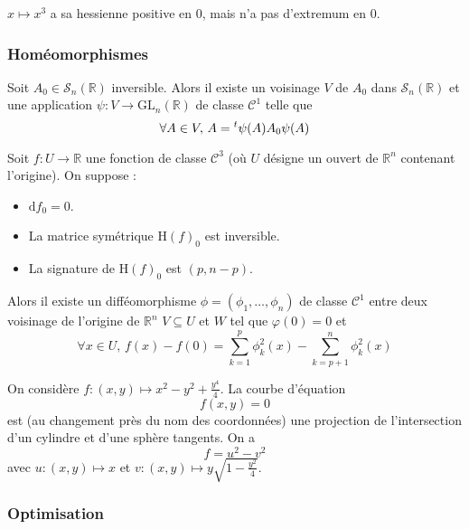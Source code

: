 	\begin{cexample}
		$x \mapsto x^3$ a sa hessienne positive en $0$, mais n'a pas d'extremum en $0$.
	\end{cexample}

	\subsubsection{Homéomorphismes}


	\begin{lemma}
		Soit $A_0 \in \mathcal{S}_n(\mathbb{R})$ inversible. Alors il existe un voisinage $V$ de $A_0$ dans $\mathcal{S}_n(\mathbb{R})$ et une application $\psi : V \rightarrow \mathrm{GL}_n(\mathbb{R})$ de classe $\mathcal{C}^1$ telle que
		\[ \forall A \in V, \, A = \mathstrut ^t \psi(A) A_0 \psi(A) \]
	\end{lemma}


	\begin{lemma}[Morse]
		Soit $f : U \rightarrow \mathbb{R}$ une fonction de classe $\mathcal{C}^3$ (où $U$ désigne un ouvert de $\mathbb{R}^n$ contenant l'origine). On suppose :
		\begin{itemize}
			\item $\mathrm{d} f_0 = 0$.
			\item La matrice symétrique $\mathrm{H} (f)_0$ est inversible.
			\item La signature de $\mathrm{H}(f)_0$ est $(p, n-p)$.
		\end{itemize}
		Alors il existe un difféomorphisme $\phi = (\phi_1, \dots, \phi_n)$ de classe $\mathcal{C}^1$ entre deux voisinage de l'origine de $\mathbb{R}^n$ $V \subseteq U$ et $W$ tel que $\varphi(0) = 0$ et
		\[ \forall x \in U, \, f(x) - f(0) = \sum_{k=1}^p \phi_k^2(x) - \sum_{k=p+1}^n \phi_k^2(x) \]
	\end{lemma}


	\begin{example}
		On considère $f : (x,y) \mapsto x^2-y^2+\frac{y^4}{4}$. La courbe d'équation
		\[ f(x,y) = 0 \]
		est (au changement près du nom des coordonnées) une projection de l'intersection d'un cylindre et d'une sphère tangents. On a
		\[ f = u^2 - v^2 \]
		avec $u : (x,y) \mapsto x$ et $v : (x,y) \mapsto y \sqrt{1-\frac{y^2}{4}}$.
	\end{example}

	\subsubsection{Optimisation}

